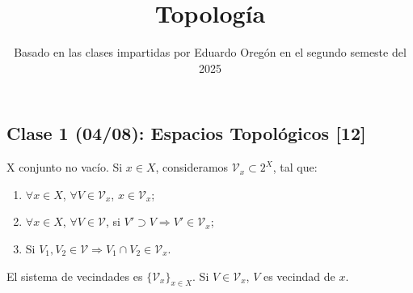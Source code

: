 \documentclass[a4paper]{report}
\title{Topología}
\author{}
\date{Basado en las clases impartidas por Eduardo Oregón en el segundo semeste del 2025}
\begin{document}
    \maketitle
    \tableofcontents

    \chapter{}
    \setcounter{section}{0}
	\section{Clase 1 (04/08): Espacios Topológicos [12]}

	\begin{definition}
		X conjunto no vacío. Si $x\in X$, consideramos $\mathcal{V}_x \subset 2^{X}$, tal que:

		\begin{enumerate}
			\item $\forall x \in X$, $\forall V \in \mathcal{V}_x$, $x \in \mathcal{V}_x$;

			\item $\forall x \in X$, $\forall V \in \mathcal{V}$, si $V' \supset V \Rightarrow V' \in \mathcal{V}_x$;

			\item Si $V_1,V_2 \in \mathcal{V} \Rightarrow V_1 \cap V_2 \in \mathcal{V}_x$.
		\end{enumerate}

		\noindent El sistema de vecindades es $\{ \mathcal{V}_x \}_{x \in X}$. Si $V \in \mathcal{V}_x$, $V$ es vecindad de $x$.  
	\end{definition}
\end{document}
